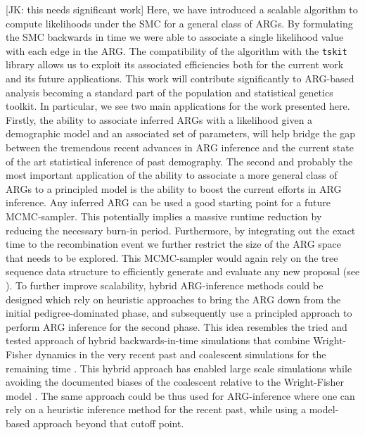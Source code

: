 \documentclass{article}
\begin{document}
[JK: this needs significant work]
Here, we have introduced a scalable algorithm to compute likelihoods
under the SMC for a general class of ARGs. By formulating the SMC backwards in time
we were able to associate a single likelihood value with each edge in the ARG.
The compatibility of the algorithm with the \texttt{tskit} library allows us to
exploit its associated efficiencies both for the current work and its future
applications. This work will contribute significantly
to ARG-based analysis becoming a standard part of the population
and statistical genetics toolkit.
In particular, we see two main applications for the work presented here.
Firstly, the ability to associate inferred ARGs with a likelihood given a demographic
model and an associated set of parameters, will help bridge the gap between the tremendous recent
advances in ARG inference and the current state of the art statistical inference of
past demography.
The second and probably the most important application of the ability to associate a more
general class of ARGs to a principled model is the ability to boost the current efforts
in ARG inference. 
Any inferred ARG can be used a good starting point
for a future MCMC-sampler. This potentially implies a massive runtime reduction by
reducing the necessary burn-in period. Furthermore, by integrating out the exact time
to the recombination event we further restrict the size of the ARG space that needs to
be explored. This MCMC-sampler would again rely on the tree sequence data structure to
efficiently generate and evaluate any new proposal (see \citep{mahmoudi_bayesian_2022}).
To further improve scalability, hybrid ARG-inference methods could be designed which
rely on heuristic approaches to bring the ARG down from the initial pedigree-dominated phase,
and subsequently use a principled approach to perform ARG inference for the second phase.
This idea resembles the tried and tested approach of hybrid backwards-in-time simulations 
that combine Wright-Fisher dynamics in the very recent past and coalescent simulations 
for the remaining time \citep{bhaskar_distortion_2014, nelson_accounting_2020}. This hybrid
approach has enabled large scale simulations while avoiding the documented biases of the
coalescent relative to the Wright-Fisher model \citep{bhaskar_distortion_2014, wakeley_gene_2012}. 
The same approach could be thus used for ARG-inference where one can rely on a heuristic 
inference method for the recent past, while using a model-based approach beyond that cutoff point.
\end{document}
